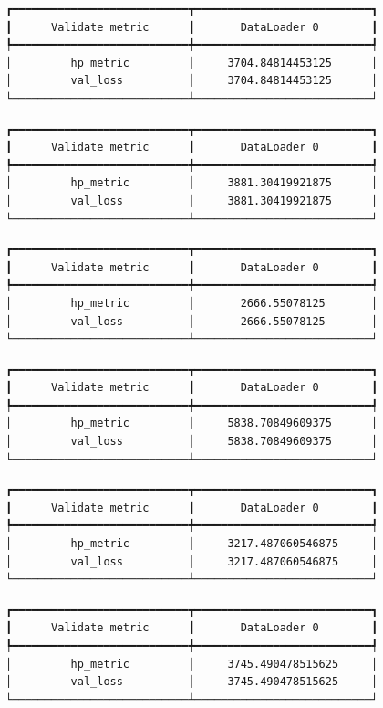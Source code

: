 \documentclass[
  letterpaper,
  DIV=11,
  numbers=noendperiod]{scrreprt}
\begin{document}
\begin{verbatim}
┏━━━━━━━━━━━━━━━━━━━━━━━━━━━┳━━━━━━━━━━━━━━━━━━━━━━━━━━━┓
┃      Validate metric      ┃       DataLoader 0        ┃
┡━━━━━━━━━━━━━━━━━━━━━━━━━━━╇━━━━━━━━━━━━━━━━━━━━━━━━━━━┩
│         hp_metric         │     3704.84814453125      │
│         val_loss          │     3704.84814453125      │
└───────────────────────────┴───────────────────────────┘
\end{verbatim}

\begin{verbatim}
┏━━━━━━━━━━━━━━━━━━━━━━━━━━━┳━━━━━━━━━━━━━━━━━━━━━━━━━━━┓
┃      Validate metric      ┃       DataLoader 0        ┃
┡━━━━━━━━━━━━━━━━━━━━━━━━━━━╇━━━━━━━━━━━━━━━━━━━━━━━━━━━┩
│         hp_metric         │     3881.30419921875      │
│         val_loss          │     3881.30419921875      │
└───────────────────────────┴───────────────────────────┘
\end{verbatim}

\begin{verbatim}
┏━━━━━━━━━━━━━━━━━━━━━━━━━━━┳━━━━━━━━━━━━━━━━━━━━━━━━━━━┓
┃      Validate metric      ┃       DataLoader 0        ┃
┡━━━━━━━━━━━━━━━━━━━━━━━━━━━╇━━━━━━━━━━━━━━━━━━━━━━━━━━━┩
│         hp_metric         │       2666.55078125       │
│         val_loss          │       2666.55078125       │
└───────────────────────────┴───────────────────────────┘
\end{verbatim}

\begin{verbatim}
┏━━━━━━━━━━━━━━━━━━━━━━━━━━━┳━━━━━━━━━━━━━━━━━━━━━━━━━━━┓
┃      Validate metric      ┃       DataLoader 0        ┃
┡━━━━━━━━━━━━━━━━━━━━━━━━━━━╇━━━━━━━━━━━━━━━━━━━━━━━━━━━┩
│         hp_metric         │     5838.70849609375      │
│         val_loss          │     5838.70849609375      │
└───────────────────────────┴───────────────────────────┘
\end{verbatim}

\begin{verbatim}
┏━━━━━━━━━━━━━━━━━━━━━━━━━━━┳━━━━━━━━━━━━━━━━━━━━━━━━━━━┓
┃      Validate metric      ┃       DataLoader 0        ┃
┡━━━━━━━━━━━━━━━━━━━━━━━━━━━╇━━━━━━━━━━━━━━━━━━━━━━━━━━━┩
│         hp_metric         │     3217.487060546875     │
│         val_loss          │     3217.487060546875     │
└───────────────────────────┴───────────────────────────┘
\end{verbatim}

\begin{verbatim}
┏━━━━━━━━━━━━━━━━━━━━━━━━━━━┳━━━━━━━━━━━━━━━━━━━━━━━━━━━┓
┃      Validate metric      ┃       DataLoader 0        ┃
┡━━━━━━━━━━━━━━━━━━━━━━━━━━━╇━━━━━━━━━━━━━━━━━━━━━━━━━━━┩
│         hp_metric         │     3745.490478515625     │
│         val_loss          │     3745.490478515625     │
└───────────────────────────┴───────────────────────────┘
\end{verbatim}
\end{document}

